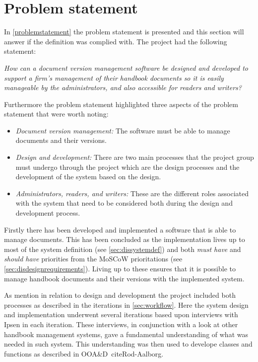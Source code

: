 \section{Problem statement}
In \cref{problemstatement} the problem statement is presented and this section will answer if the definition was complied with.
The project had the following statement:

\begin{center}
\textit{How can a document version management software be designed and developed to support a firm's management of their handbook documents so it is easily manageable by the administrators, and also accessible for readers and writers?}
\end{center}

Furthermore the problem statement highlighted three aspects of the problem statement that were worth noting:

\begin{itemize}
	\item 
		\textit{Document version management:} 
		The software must be able to manage documents and their versions.
	\item 
		\textit{Design and development:} 
		There are two main processes that the project group must undergo through the project which are the design processes and the development of the system based on the design.
	\item 
		\textit{Administrators, readers, and writers:} 
		These are the different roles associated with the system that need to be considered both during the design and development process.

\end{itemize}

Firstly there has been developed and implemented a software that is able to manage documents.
This has been concluded as the implementation lives up to most of the system definition (see \cref{sec:dissystemdef}) and both \textit{must have} and \textit{should have} priorities from the MoSCoW prioritations (see \cref{sec:disdesignrequirements}).
Living up to these ensures that it is possible to manage handbook documents and their versions with the implemented system.

As mention in relation to design and development the project included both processes as described in the iterations in \cref{sec:workflow}.
Here the system design and implementation underwent several iterations based upon interviews with Ipsen in each iteration.
These interviews, in conjunction with a look at other handbook management systems, gave a fundamental understanding of what was needed in such system.
This understanding was then used to develope classes and functions as described in OOA\&D\ cite{Rod-Aalborg}.

